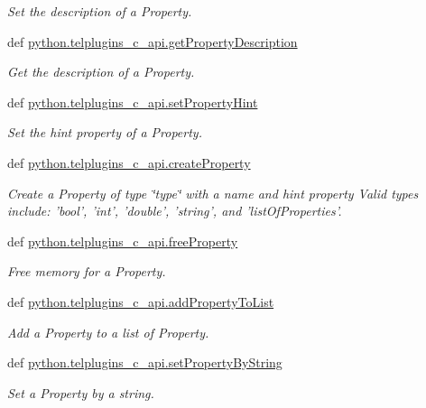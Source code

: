 \begin{DoxyCompactItemize}
\begin{DoxyCompactList}\small\item\em Set the description of a Property. \end{DoxyCompactList}\item 
def \hyperlink{group__plugin__properties_ga42d38a8b05bd644ecc89df8a5e8c4ea5}{python.\-telplugins\-\_\-c\-\_\-api.\-get\-Property\-Description}
\begin{DoxyCompactList}\small\item\em Get the description of a Property. \end{DoxyCompactList}\item 
def \hyperlink{group__plugin__properties_gaaf40d279324bff12793912e7beef3cb7}{python.\-telplugins\-\_\-c\-\_\-api.\-set\-Property\-Hint}
\begin{DoxyCompactList}\small\item\em Set the hint property of a Property. \end{DoxyCompactList}\item 
def \hyperlink{group__plugin__properties_ga0db8376243fd2944fd917c2319c2e20e}{python.\-telplugins\-\_\-c\-\_\-api.\-create\-Property}
\begin{DoxyCompactList}\small\item\em Create a Property of type \char`\"{}type\char`\"{} with a name and hint property Valid types include\-: 'bool', 'int', 'double', 'string', and 'list\-Of\-Properties'. \end{DoxyCompactList}\item 
def \hyperlink{group__plugin__properties_gad7970eb0259951b46ee6423185e35f91}{python.\-telplugins\-\_\-c\-\_\-api.\-free\-Property}
\begin{DoxyCompactList}\small\item\em Free memory for a Property. \end{DoxyCompactList}\item 
def \hyperlink{group__plugin__properties_ga43d526b09b740d4214c10a658c3ac847}{python.\-telplugins\-\_\-c\-\_\-api.\-add\-Property\-To\-List}
\begin{DoxyCompactList}\small\item\em Add a Property to a list of Property. \end{DoxyCompactList}\item 
def \hyperlink{group__plugin__properties_ga28dfe2274917c2b8b072843a03156c3c}{python.\-telplugins\-\_\-c\-\_\-api.\-set\-Property\-By\-String}
\begin{DoxyCompactList}\small\item\em Set a Property by a string. \end{DoxyCompactList}\item 

\end{DoxyCompactItemize}
